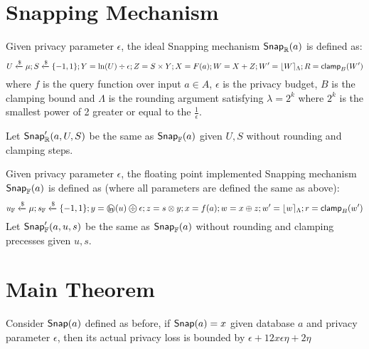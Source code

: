 \documentclass[a4paper,11pt]{article}
\begin{document}
\section{Snapping Mechanism}

\begin{defn}
Given privacy parameter $\epsilon$, the ideal Snapping mechanism $\mathsf{Snap}_{\mathbb{R}}(a)$ is defined as:
\[
	U \xleftarrow{\$} \mu; S \xleftarrow{\$} \{-1, 1\}; Y = \ln (U) \div \epsilon; Z = S \times Y; X = F(a); W = X + Z; W' = \lfloor W \rceil_{\Lambda}; R = \mathsf{clamp}_B (W')
\]
where $f$ is the query function over input $a \in A$, $\epsilon$ is the privacy budget, $B$ is the clamping bound and $\Lambda$ is the rounding argument satisfying $\lambda = 2^k$ where $2^k$ is the smallest power of 2 greater or equal to the $\frac{1}{\epsilon}$.
%

%
Let $\mathsf{Snap}_{\mathbb{R}}'(a, U, S)$ be the same as $\mathsf{Snap}_{\mathbb{F}}(a)$ given $U, S$ without rounding and clamping steps.
\end{defn}


\begin{defn}
Given privacy parameter $\epsilon$, the floating point implemented
Snapping mechanism $\mathsf{Snap}_{\mathbb{F}}(a)$ is defined as (where all parameters are defined the same as above):
\[
	u_{\mathbb{F}} \xleftarrow{\$} \edistr;
	s_{\mathbb{F}} \samplel \{-1, 1\};
	y = \oln (u) \odiv \epsilon; z = s \otimes y; x = f(a);
	w = x \oplus z; w' = \round{w}_{\Lambda}; r = \clamp_B (w')
\]
Let $\mathsf{Snap}_{\mathbb{F}}'(a, u, s)$ be the same as $\mathsf{Snap}_{\mathbb{F}}(a)$ without rounding and clamping precesses given $u, s$.
\end{defn}




\section{Main Theorem}

\begin{thm}
Consider $\mathsf{Snap}(a)$ defined as before, if $\mathsf{Snap}(a) = x$ given database $a$ and privacy parameter $\epsilon$, then its actual privacy loss is bounded by $\epsilon + 12 x \epsilon \eta + 2\eta$
\end{thm}
\end{document}
